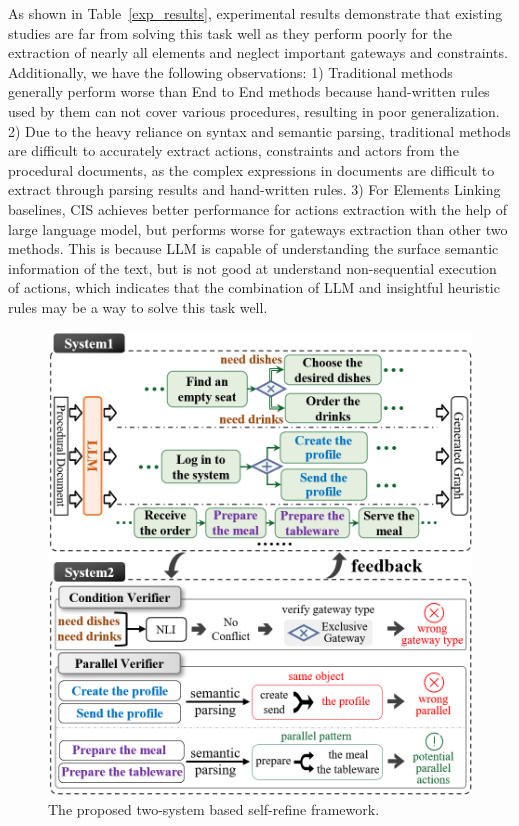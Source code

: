 As shown in Table~\ref{exp_results}, 
experimental results demonstrate that existing studies are far from solving this task well as they perform poorly for the extraction of nearly all elements and neglect important gateways and constraints. 
Additionally, we have the following observations:
1) Traditional methods generally perform worse than End to End methods because hand-written rules used by them can not cover various procedures, resulting in poor generalization. 
2) Due to the heavy reliance on syntax and semantic parsing, traditional methods are difficult to accurately extract actions, constraints and actors from the procedural documents, as the complex expressions in documents are difficult to extract through parsing results and hand-written rules. 
3) For Elements Linking baselines, CIS achieves better performance for actions extraction with the help of large language model, but performs worse for gateways extraction than other two methods. This is because LLM is capable of understanding the surface semantic information of the text, but is not good at understand non-sequential execution of actions, which indicates that the combination of LLM and insightful heuristic rules may be a way to solve this task well. 

\begin{figure}[!t]
    \centering
    \includegraphics[width=\textwidth]{figures/Method.png}
    \caption{The proposed two-system based self-refine framework. 
    }
    \label{fig:method}
\end{figure}

